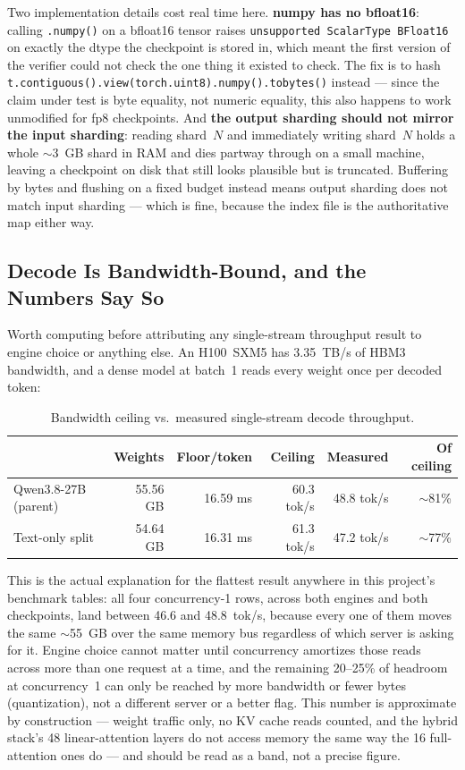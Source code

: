 \documentclass[11pt]{article}
\begin{document}
Two implementation details cost real time here. \textbf{numpy has no bfloat16}: calling
\texttt{.numpy()} on a bfloat16 tensor raises \texttt{unsupported ScalarType BFloat16}
on exactly the dtype the checkpoint is stored in, which meant the first version of the
verifier could not check the one thing it existed to check. The fix is to hash
\texttt{t.contiguous().view(torch.uint8).numpy().tobytes()} instead --- since the claim
under test is byte equality, not numeric equality, this also happens to work unmodified
for fp8 checkpoints. And \textbf{the output sharding should not mirror the input
sharding}: reading shard~$N$ and immediately writing shard~$N$ holds a whole $\sim$3~GB
shard in RAM and dies partway through on a small machine, leaving a checkpoint on disk
that still looks plausible but is truncated. Buffering by bytes and flushing on a fixed
budget instead means output sharding does not match input sharding --- which is fine,
because the index file is the authoritative map either way.

\subsection{Decode Is Bandwidth-Bound, and the Numbers Say So}
\label{sec:qwen-bandwidth}

Worth computing before attributing any single-stream throughput result to engine choice
or anything else. An H100~SXM5 has 3.35~TB/s of HBM3 bandwidth, and a dense model at
batch~1 reads every weight once per decoded token:

\begin{table}[h]
\centering
\small
\begin{tabular}{lrrrrr}
\toprule
 & Weights & Floor/token & Ceiling & Measured & Of ceiling \\
\midrule
Qwen3.8-27B (parent) & 55.56 GB & 16.59 ms & 60.3 tok/s & 48.8 tok/s & $\sim$81\% \\
Text-only split & 54.64 GB & 16.31 ms & 61.3 tok/s & 47.2 tok/s & $\sim$77\% \\
\bottomrule
\end{tabular}
\caption{Bandwidth ceiling vs.\ measured single-stream decode throughput.}
\end{table}

This is the actual explanation for the flattest result anywhere in this project's
benchmark tables: all four concurrency-1 rows, across both engines and both
checkpoints, land between 46.6 and 48.8~tok/s, because every one of them moves the same
$\sim$55~GB over the same memory bus regardless of which server is asking for it. Engine
choice cannot matter until concurrency amortizes those reads across more than one
request at a time, and the remaining 20--25\% of headroom at concurrency~1 can only be
reached by more bandwidth or fewer bytes (quantization), not a different server or a
better flag. This number is approximate by construction --- weight traffic only, no KV
cache reads counted, and the hybrid stack's 48 linear-attention layers do not access
memory the same way the 16 full-attention ones do --- and should be read as a band, not
a precise figure.
\end{document}
